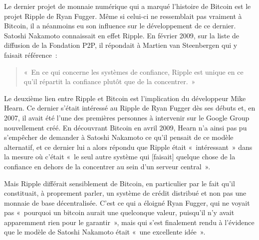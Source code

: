 Le dernier projet de monnaie numérique qui a marqué l'histoire de Bitcoin est le projet Ripple de Ryan Fugger. Même si celui-ci ne ressemblait pas vraiment à Bitcoin, il a néanmoins eu son influence sur le développement de ce dernier. Satoshi Nakamoto connaissait en effet Ripple. En février 2009, sur la liste de diffusion de la Fondation P2P, il répondait à Martien van Steenbergen qui y faisait référence~:

\begin{quote}
«~En ce qui concerne les systèmes de confiance, Ripple est unique en ce qu'il répartit la confiance plutôt que de la concentrer.~»
\end{quote}

Le deuxième lien entre Ripple et Bitcoin est l'implication du développeur Mike Hearn. Ce dernier s'était intéressé au Ripple de Ryan Fugger dès ses débuts et, en 2007, il avait été l'une des premières personnes à intervenir sur le Google Group nouvellement créé. En découvrant Bitcoin en avril 2009, Hearn n'a ainsi pas pu s'empêcher de demander à Satoshi Nakamoto ce qu'il pensait de ce modèle alternatif, et ce dernier lui a alors répondu que Ripple était «~intéressant~» dans la mesure où c'était «~le seul autre système qui [faisait] quelque chose de la confiance en dehors de la concentrer au sein d'un serveur central~».

Mais Ripple différait sensiblement de Bitcoin, en particulier par le fait qu'il constituait, à proprement parler, un système de crédit distribué et non pas une monnaie de base décentralisée. C'est ce qui a éloigné Ryan Fugger, qui ne voyait pas «~pourquoi un bitcoin aurait une quelconque valeur, puisqu'il n'y avait apparemment rien pour le garantir~», mais qui s'est finalement rendu à l'évidence que le modèle de Satoshi Nakamoto était «~une excellente idée~».

